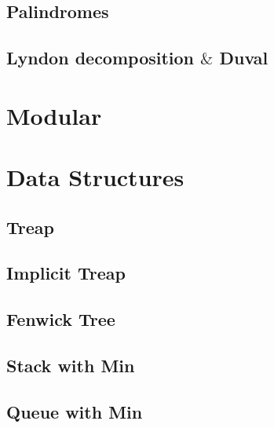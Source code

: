 \documentclass[10pt]{article}
\begin{document}
\subsection{Palindromes}

\subsection{Lyndon decomposition $\&$ Duval}




\newpage
\section{Modular}




\newpage
\section{Data Structures}
\subsection{Treap}

\subsection{Implicit Treap}

\subsection{Fenwick Tree}

\subsection{Stack with Min}

\subsection{Queue with Min}




\newpage

\end{document}
